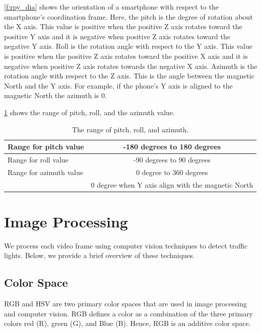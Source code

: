 \ref{f:rpy_dia} shows the orientation of a smartphone with respect to the smartphone's coordination frame.
Here, the pitch is the degree of rotation about the X axis.
This value is positive when the positive Z axis rotates toward the positive Y axis and it is negative when positive Z axis rotates toward the negative Y axis.
Roll is the rotation angle with respect to the Y axis.
This value is positive when the positive Z axis rotates toward the positive X axis and it is negative when positive Z axis rotates towards the negative X axis.
Azimuth is the rotation angle with respect to the Z axis.
This is the angle between the magnetic North and the Y axis.
For example, if the phone's Y axis is aligned to the magnetic North the azimuth is 0.

\ref{t:rpy} shows the range of pitch, roll, and the azimuth value.
\begin{table}[h!]
  \centering
  \caption{The range of pitch, roll, and azimuth.}
  \label{t:rpy}
  \begin{tabular}{  l | c  }
    
    Range for pitch value & -180 degrees to 180 degrees \\
    \hline
    Range for roll value & -90 degrees to 90 degrees  \\
    \hline 
    Range for azimuth value & 0 degree to 360 degrees \\
    & 0 degree when Y axis align with the magnetic North \\
    
  \end{tabular}
\end{table}


\section {Image Processing}
We process each video frame using computer vision techniques to detect traffic lights. 
Below, we provide a brief overview of these techniques. 

\subsection{Color Space}
\label{s:color_space}
RGB \cite{rgb} and HSV \cite{hsv} are two primary color spaces that are used in image processing and computer vision.
RGB defines a color as a combination of the three primary colors red (R), green (G), and Blue (B).
Hence, RGB is an additive color space.

